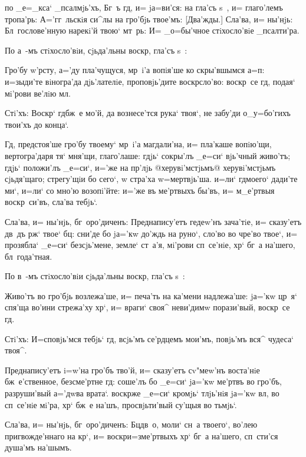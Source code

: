 
по _е=_кса` _псалмjь'хъ, Бг~ъ гд, и= jа=ви'ся: на 
гла'съ s~, и= глаго'лемъ тропа'рь: А='гг~льскiя си^лы на 
гро'бjь твое'мъ: [Два'жды.] Сла'ва, и= ны'нjь: 
Бл~гослове'нную нарекi'й твою` мт~рь: И= _о=бы'чное 
стiхосло'вiе _псалти'ра.

По а~-мъ стiхосло'вiи, сjьда'льны воскр, гла'съ 
s~: 

Гро'бу w'рсту, а='ду пла'чущуся, мр~i'а вопiя'ше 
ко скры'вшымся а=п: и=зыди'те вiногра'да 
дjь'лателiе, проповjь'дите воскр сло'во: воскр~се 
гд, подая` мi'рови ве'лiю мл.

Стi'хъ: Воскр` гд бж~е мо'й, да вознесе'тся 
рука` твоя`, не забу'ди о_у=бо'гихъ твои'хъ до конца`.

Гд, предстоя'ше гро'бу твоему` мр~i'а магдали'на, 
и= пла'каше вопiю'щи, вертогра'даря тя` мня'щи, 
глаго'лаше: гдjь` сокры'лъ _е=си` вjь'чный живо'тъ; гдjь` 
положи'лъ _е=си`, и='же на пр'лjь @херувi'мстjьмъ@ 
{херувi'мстjьмъ сjьдя'щаго}; стрегу'щiи бо сего`, w\т 
стра'ха w=мертвjь'ша. и=ли` гд моего` дади'те ми`, 
и=ли` со мно'ю возопi'йте: и='же въ ме'ртвыхъ бы'въ, и= 
м_е'ртвыя воскр~си'въ, сла'ва тебjь`.

Сла'ва, и= ны'нjь, бг~оро'диченъ: Преднапису'етъ 
гедеw'нъ зача'тiе, и= сказу'етъ дв~дъ рж` твое` 
бц: сни'де бо jа='кw до'ждь на руно`, сло'во во чре'во 
твое`, и= прозябла` _е=си` без\ъ сjь'мене, земле` ст~а'я, 
мi'рови сп~се'нiе, хр` бг~а на'шего, бл~года'тная.

По в~-мъ стiхосло'вiи сjьда'льны воскр, гла'съ s~: 

Живо'тъ во гро'бjь возлежа'ше, и= печа'ть на ка'мени 
надлежа'ше: jа='кw цр~я` спя'ща во'ини стрежа'ху хр`, 
и= враги` своя^ неви'димw порази'вый, воскр~се гд.

Стi'хъ: И=сповjь'мся тебjь` гд, всjь'мъ се'рдцемъ 
мои'мъ, повjь'мъ вся^ чудеса` твоя^.

Преднапису'етъ i=w'на гро'бъ тво'й, и= сказу'етъ 
сv"меw'нъ воста'нiе бж~е'ственное, безсме'ртне гд: 
соше'лъ бо _е=си` jа='кw ме'ртвъ во гро'бъ, разруши'вый 
а='дwва врата`. воскр же _е=си` кромjь` тлjь'нiя 
jа='кw вл, во сп~се'нiе мi'ра, хр` бж~е на'шъ, 
просвjьти'вый су'щыя во тьмjь`.

Сла'ва, и= ны'нjь, бг~оро'диченъ: Бц дв~о, моли` 
сн~а твоего`, во'лею пригвожде'ннаго на кр`, и= 
воскр и=з\ъ ме'ртвыхъ хр` бг~а на'шего, 
сп~сти'ся душа'мъ на'шымъ.


